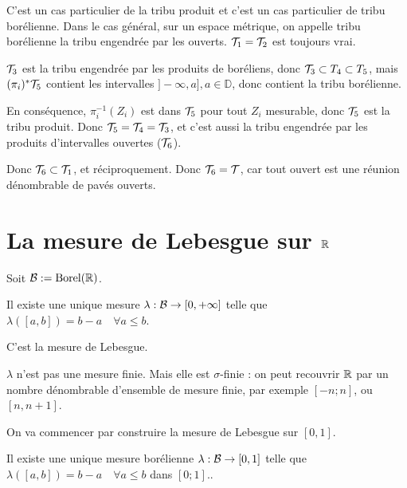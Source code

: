\documentclass[10pt,a4paper,notitlepage ]{report}
\begin{document}
\begin{rem}

C'est un cas particulier de la tribu produit et c'est un cas particulier de tribu borélienne. Dans le cas général, sur un espace métrique, on appelle tribu borélienne la tribu engendrée par les ouverts.
$\mathcal T_1 = \mathcal T_2$ est toujours vrai.

\end{rem}

\begin{demo}

$\mathcal T_3$ est la tribu engendrée par les produits de boréliens, donc $\mathcal T_3 \subset T_4 \subset T_5$, mais $(\pi_i)^*\mathcal T_5$ contient les intervalles $]-\infty, a], a\in\mathbb D$, donc contient la tribu borélienne.

En conséquence, $\pi_i^{-1}(Z_i)$ est dans $\mathcal T_5$ pour tout $Z_i$ mesurable, donc $\mathcal T_5$ est la tribu produit. Donc $\mathcal T_5 = \mathcal T_4=\mathcal T_3$, et c'est aussi la tribu engendrée par les produits d'intervalles ouvertes ($\mathcal T_6$).

Donc $\mathcal T_6 \subset \mathcal T_1$, et réciproquement. Donc $\mathcal T_6=\mathcal T$, car tout ouvert est une réunion dénombrable de pavés ouverts.
\end{demo}

\section{La mesure de Lebesgue sur $\mathbb R$}

Soit $\mathcal B := \mathrm{Borel}(\mathbb R)$.

\begin{theorem}
Il existe une unique mesure $\lambda : \mathcal B \rightarrow [0, + \infty ] $ telle que $\lambda ( [a,b] )= b-a \quad \forall a \leq b $.
\end{theorem} 

C'est la mesure de Lebesgue. 

\begin{rem}
$\lambda$ n'est pas une mesure finie. Mais elle est $\sigma$-finie : on peut recouvrir $\mathbb R$ par un nombre dénombrable d'ensemble de mesure finie, par exemple $[-n;n] $, ou $[n,n+1]$.
\end{rem}

On va commencer par construire la mesure de Lebesgue sur $[0, 1]$. 

\begin{theorem}
Il existe une unique mesure borélienne $\lambda : \mathcal B \rightarrow [0, 1] $ telle que $\lambda ( [a,b]) = b-a \quad \forall a \leq b $ dans $[0;1]$..
\end{theorem}
\end{document}
